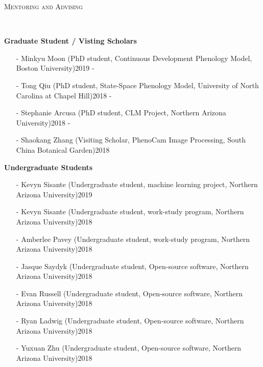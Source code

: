 \documentclass[10pt]{article}
\newenvironment{changemargin}[2]{%
  \begin{list}{}{%
 \setlength{\topsep}{0pt}%
 \setlength{\leftmargin}{#1}%
 \setlength{\rightmargin}{#2}%
 \setlength{\listparindent}{\parindent}%
 \setlength{\itemindent}{\parindent}%
 \setlength{\parsep}{\parskip}%
  }%
  \item[]}{\end{list}
}
\newcommand{\lineover}{
  \begin{changemargin}{-0.05in}{-0.05in}
  \vspace*{-8pt}
  \hrulefill \\
  \vspace*{-2pt}
  \end{changemargin}
}
\newcommand{\header}[1]{
  \begin{changemargin}{-0.5in}{-0.5in}
  \scshape{#1}\\
  \lineover
  \end{changemargin}
}
\newenvironment{body} {
  \vspace*{-2pt}
  \begin{changemargin}{-0.5in}{-0.5in}
}
{\end{changemargin}
}
\begin{document}
\header{Mentoring and Advising}
\begin{body}


  \textbf{Graduate Student / Visting Scholars}\\
  \vspace*{-4pt}
  \begin{itemize} \itemsep -0pt
    \item[-]  Minkyu Moon (PhD student, Continuous Development Phenology Model, Boston University)\hfill {2019 -}\\
    \item[-]  Tong Qiu (PhD student, State-Space Phenology Model, University of North Carolina at Chapel Hill)\hfill {2018 -}\\
    \item[-]  Stephanie Arcusa (PhD student, CLM Project, Northern Arizona University)\hfill {2018 -}\\
    \item[-]  Shaokang Zhang (Visiting Scholar, PhenoCam Image Processing, South China Botanical Garden)\hfill {2018}\\
  \end{itemize}

  \medskip
  \textbf{Undergraduate Students}\\
  \vspace*{-4pt}
  \begin{itemize} \itemsep -0pt
    \item[-]  Kevyn Sisante (Undergraduate student, machine learning project, Northern Arizona University)\hfill {2019}\\
    \item[-]  Kevyn Sisante (Undergraduate student, work-study program, Northern Arizona University)\hfill {2018}\\
    \item[-]  Amberlee Pavey (Undergraduate student, work-study program, Northern Arizona University)\hfill {2018}\\
    \item[-]  Jasque Saydyk (Undergraduate student, Open-source software, Northern Arizona University)\hfill {2018}\\
    \item[-]  Evan Russell (Undergraduate student, Open-source software, Northern Arizona University)\hfill {2018}\\
    \item[-]  Ryan Ladwig (Undergraduate student, Open-source software, Northern Arizona University)\hfill {2018}\\
    \item[-]  Yuxuan Zhu (Undergraduate student, Open-source software, Northern Arizona University)\hfill {2018}\\
  \end{itemize}

  \medskip

\end{body}
\medskip
\end{document}
